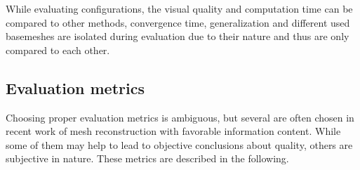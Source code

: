     While evaluating configurations, the visual quality and computation time can be compared to other methods, convergence time, generalization and different used basemeshes
    are isolated during evaluation due to their nature and thus are only compared to each other.

\subsection{Evaluation metrics}

    Choosing proper evaluation metrics is ambiguous, but several are often chosen in recent work of mesh reconstruction with favorable information content. 
    While some of them may help to lead to objective conclusions about quality, others are subjective in nature. These metrics 
    are described in the following. 

